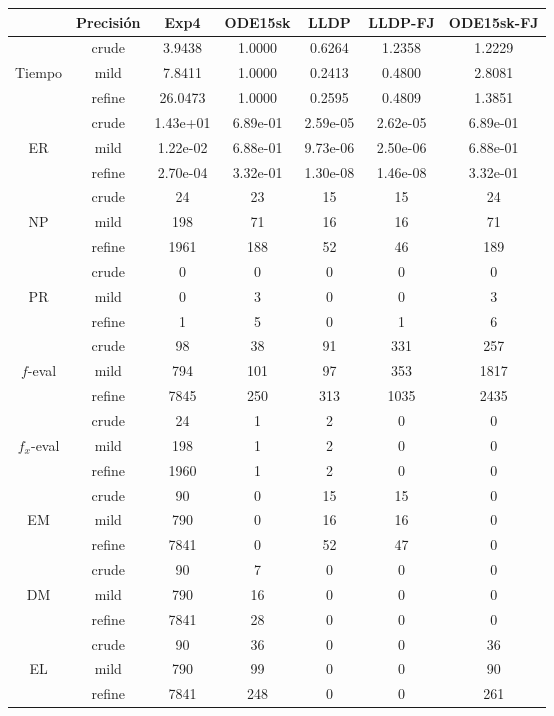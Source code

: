 \begin{table}[htb]
	\centering
\begin{tabular}{ |c|c|c|c|c|c|c| }
\hline
 & Precisi\'on & Exp4 & ODE15sk & LLDP & LLDP-FJ & ODE15sk-FJ \\
\hline
  & crude & 3.9438 & 1.0000 & 0.6264 & 1.2358 & 1.2229 \\
 Tiempo  & mild & 7.8411 & 1.0000 & 0.2413 & 0.4800 & 2.8081 \\
  & refine & 26.0473 & 1.0000 & 0.2595 & 0.4809 & 1.3851 \\
\hline
  & crude & 1.43e+01 & 6.89e-01 & 2.59e-05 & 2.62e-05 & 6.89e-01 \\
 ER  & mild & 1.22e-02 & 6.88e-01 & 9.73e-06 & 2.50e-06 & 6.88e-01 \\
  & refine & 2.70e-04 & 3.32e-01 & 1.30e-08 & 1.46e-08 & 3.32e-01 \\
\hline
  & crude & 24 & 23 & 15 & 15 & 24 \\
 NP  & mild & 198 & 71 & 16 & 16 & 71 \\
  & refine & 1961 & 188 & 52 & 46 & 189 \\
\hline
  & crude & 0 & 0 & 0 & 0 & 0 \\
 PR  & mild & 0 & 3 & 0 & 0 & 3 \\
  & refine & 1 & 5 & 0 & 1 & 6 \\
\hline
  & crude & 98 & 38 & 91 & 331 & 257 \\
 $f$-eval  & mild & 794 & 101 & 97 & 353 & 1817 \\
  & refine & 7845 & 250 & 313 & 1035 & 2435 \\
\hline
  & crude & 24 & 1 & 2 & 0 & 0 \\
 $f_x$-eval  & mild & 198 & 1 & 2 & 0 & 0 \\
  & refine & 1960 & 1 & 2 & 0 & 0 \\
\hline
  & crude & 90 & 0 & 15 & 15 & 0 \\
 EM  & mild & 790 & 0 & 16 & 16 & 0 \\
  & refine & 7841 & 0 & 52 & 47 & 0 \\
\hline
  & crude & 90 & 7 & 0 & 0 & 0 \\
 DM  & mild & 790 & 16 & 0 & 0 & 0 \\
  & refine & 7841 & 28 & 0 & 0 & 0 \\
\hline
  & crude & 90 & 36 & 0 & 0 & 36 \\
 EL  & mild & 790 & 99 & 0 & 0 & 90 \\
  & refine & 7841 & 248 & 0 & 0 & 261 \\

\end{tabular}
\end{table}
